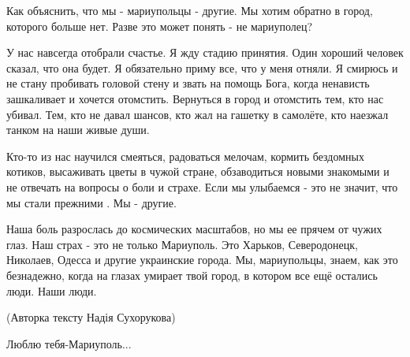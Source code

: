 Как объяснить, что мы - мариупольцы - другие. Мы хотим обратно в город,
которого больше нет. Разве это может понять - не мариуполец? 

У нас навсегда отобрали счастье. Я жду стадию принятия. Один хороший человек
сказал, что она будет. Я обязательно приму все, что у меня отняли. Я смирюсь и
не стану пробивать головой стену и звать на помощь Бога, когда ненависть
зашкаливает и хочется отомстить. Вернуться в город  и отомстить тем, кто нас
убивал. Тем, кто не давал шансов, кто жал на гашетку в самолёте, кто наезжал
танком на наши  живые души. 

Кто-то  из нас  научился  смеяться, радоваться мелочам, кормить бездомных
котиков, высаживать цветы в чужой стране, обзаводиться новыми  знакомыми и не
отвечать на вопросы о боли и страхе. Если мы улыбаемся - это не значит, что мы
стали прежними . Мы - другие. 

Наша боль разрослась до космических масштабов, но мы ее прячем от чужих глаз.
Наш страх - это не только Мариуполь. Это Харьков, Северодонецк, Николаев,
Одесса и другие украинские города. Мы, мариупольцы, знаем, как это безнадежно,
когда на  глазах умирает твой город, в котором все ещё остались люди. Наши
люди. 

(Авторка тексту Надія Сухорукова)

Люблю тебя-Мариуполь...
